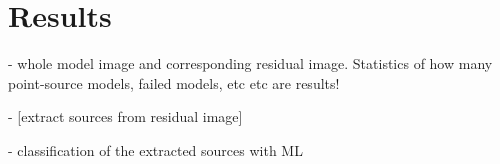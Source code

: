\section{Results}

- whole model image and corresponding residual image. Statistics of how many point-source models, failed models, etc etc are results!

- [extract sources from residual image]

- classification of the extracted sources with ML

